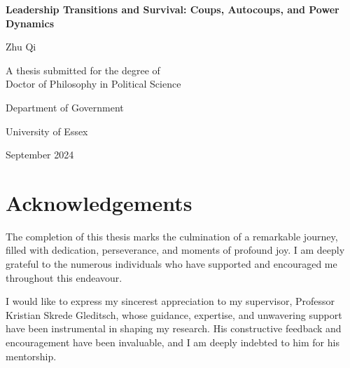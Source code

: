 \documentclass[
  12pt,
]{report}
\author{}
\date{}
\renewcommand*\contentsname{Table of contents}
\newcommand\contentsname{Table of contents}
\begin{document}
\begin{titlepage}
  \begin{center}
    \vspace*{2cm}
    
    \Huge{\textbf{Leadership Transitions and Survival: Coups, Autocoups, and Power Dynamics}}
    
    \vspace{1.5cm}
    
    \Large{Zhu Qi}
    
    \vspace{5cm}
    
    \large{A thesis submitted for the degree of \\ Doctor of Philosophy in Political Science}
    
    \vspace{0.8cm}
    
    \large{Department of Government}
    \vspace{0.5cm}
    
    \large{University of Essex}
    
    \vspace{1.5cm}
    
    \large{September 2024}
    \vspace{2cm}
    
    
  \end{center}
\end{titlepage}

\renewcommand*\contentsname{Contents}
{
\hypersetup{linkcolor=}
\setcounter{tocdepth}{2}
\tableofcontents
}
\listoffigures
\listoftables

\chapter*{Acknowledgements}\label{acknowledgements}

The completion of this thesis marks the culmination of a remarkable
journey, filled with dedication, perseverance, and moments of profound
joy. I am deeply grateful to the numerous individuals who have supported
and encouraged me throughout this endeavour.

I would like to express my sincerest appreciation to my supervisor,
Professor Kristian Skrede Gleditsch, whose guidance, expertise, and
unwavering support have been instrumental in shaping my research. His
constructive feedback and encouragement have been invaluable, and I am
deeply indebted to him for his mentorship.
\end{document}
